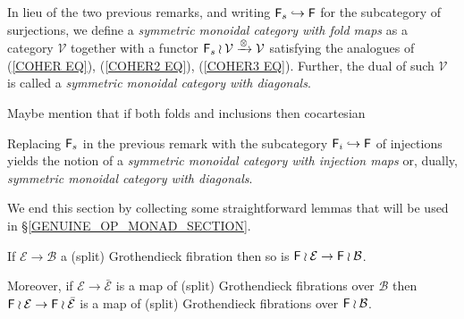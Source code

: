 \documentclass[a4paper,10pt]{article}%
\begin{document}


\begin{remark}\label{FINSURJ REM}
	In lieu of the two previous remarks,
	and writing $\mathsf{F}_s \hookrightarrow \mathsf{F}$ 
	for the subcategory of surjections,
	we define a 
	\textit{symmetric monoidal category with fold maps}
	as a category $\mathcal{V}$ together with a functor
	$\mathsf{F}_s \wr \mathcal{V} \xrightarrow{\otimes} \mathcal{V}$
	satisfying the analogues of  
	(\ref{COHER EQ}), (\ref{COHER2 EQ}), (\ref{COHER3 EQ}).
	Further, the dual of such $\mathcal{V}$ is called a 
	\textit{symmetric monoidal category with diagonals}.
\end{remark}

{\color{red} Maybe mention that if both folds and inclusions then cocartesian}

\begin{remark}
Replacing $\mathsf{F}_s$ in the previous remark with the subcategory
$\mathsf{F}_i \hookrightarrow \mathsf{F}$ of injections yields the notion of a \textit{symmetric monoidal category with injection maps} or, dually, \textit{symmetric monoidal category with diagonals}.
\end{remark}



We end this section by collecting some straightforward lemmas
that will be used in \S \ref{GENUINE_OP_MONAD_SECTION}.

\begin{lemma}\label{FWRGROTH LEM}
	If $\mathcal{E} \to \mathcal{B}$ a (split) Grothendieck fibration then so is 
	$\mathsf{F} \wr \mathcal{E} \to \mathsf{F} \wr \mathcal{B}$.

	Moreover, if 
	$\mathcal{E} \to \bar{\mathcal{E}}$ is a map of (split) Grothendieck fibrations over $\mathcal{B}$ then
	$\mathsf{F} \wr \mathcal{E} \to \mathsf{F} \wr \bar{\mathcal{E}}$ is a map of (split) Grothendieck fibrations over $\mathsf{F} \wr \mathcal{B}$.
\end{lemma}
\end{document}
